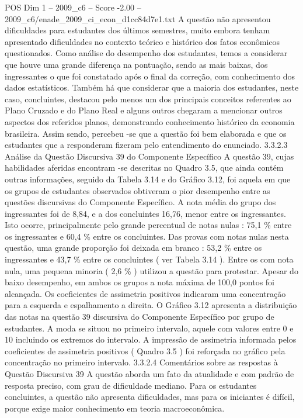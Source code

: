 \begin{textsample}{POS Dim 1 – 2009\_c6 – Score -2.00 – 2009\_c6/enade\_2009\_ci\_econ\_d1cc84d7e1.txt}
A questão não apresentou dificuldades para estudantes dos últimos semestres, muito embora tenham apresentado dificuldades no contexto teórico e histórico dos fatos econômicos questionados.
Como análise do desempenho dos estudantes, temos a considerar que houve uma grande diferença na pontuação, sendo as mais baixas, dos ingressantes o que foi constatado após o final da correção, com conhecimento dos dados estatísticos.
Também há que considerar que a maioria dos estudantes, neste caso, concluintes, destacou pelo menos um dos principais conceitos referentes ao Plano Cruzado e do Plano Real e alguns outros chegaram a mencionar outros aspectos dos referidos planos, demonstrando conhecimento histórico da economia brasileira.
Assim sendo, percebeu -se que a questão foi bem elaborada e que os estudantes que a responderam fizeram pelo entendimento do enunciado. 3.3.2.3 Análise da Questão Discursiva 39 do Componente Específico A questão 39, cujas habilidades aferidas encontram -se descritas no Quadro 3.5, que ainda contém outras informações, seguido da Tabela 3.14 e do Gráfico 3.12, foi aquela em que os grupos de estudantes observados obtiveram o pior desempenho entre as questões discursivas do Componente Específico.
A nota média do grupo dos ingressantes foi de 8,84, e a dos concluintes 16,76, menor entre os ingressantes.
Isto ocorre, principalmente pelo grande percentual de notas nulas : 75,1 \% entre os ingressantes e 60,4 \% entre os concluintes.
Das provas com notas nulas nesta questão, uma grande proporção foi deixada em branco : 53,2 \% entre os ingressantes e 43,7 \% entre os concluintes ( ver Tabela 3.14 ).
Entre os com nota nula, uma pequena minoria ( 2,6 \% ) utilizou a questão para protestar.
Apesar do baixo desempenho, em ambos os grupos a nota máxima de 100,0 pontos foi alcançada.
Os coeficientes de assimetria positivos indicaram uma concentração para a esquerda e espalhamento a direita.
O Gráfico 3.12 apresenta a distribuição das notas na questão 39 discursiva do Componente Específico por grupo de estudantes.
A moda se situou no primeiro intervalo, aquele com valores entre 0 e 10 incluindo os extremos do intervalo.
A impressão de assimetria informada pelos coeficientes de assimetria positivos ( Quadro 3.5 ) foi reforçada no gráfico pela concentração no primeiro intervalo. 3.3.2.4 Comentários sobre as respostas à Questão Discursiva 39 A questão aborda um fato da atualidade e com padrão de resposta preciso, com grau de dificuldade mediano.
Para os estudantes concluintes, a questão não apresenta dificuldades, mas para os iniciantes é difícil, porque exige maior conhecimento em teoria macroeconômica.

\end{textsample}
